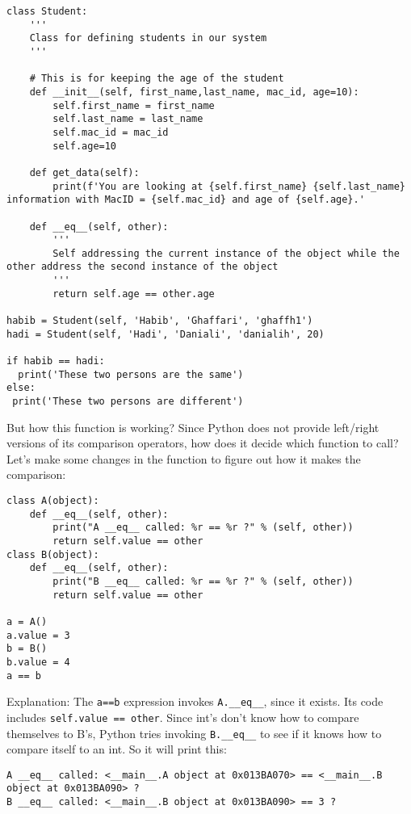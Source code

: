\documentclass[11pt]{article}
\begin{document}
\begin{verbatim}
class Student:
    '''
    Class for defining students in our system
    '''

    # This is for keeping the age of the student
    def __init__(self, first_name,last_name, mac_id, age=10):
        self.first_name = first_name
        self.last_name = last_name
        self.mac_id = mac_id
        self.age=10

    def get_data(self):
        print(f'You are looking at {self.first_name} {self.last_name} information with MacID = {self.mac_id} and age of {self.age}.'

    def __eq__(self, other):
        '''
        Self addressing the current instance of the object while the other address the second instance of the object
        '''
        return self.age == other.age

habib = Student(self, 'Habib', 'Ghaffari', 'ghaffh1')
hadi = Student(self, 'Hadi', 'Daniali', 'danialih', 20)

if habib == hadi:
  print('These two persons are the same')
else:
 print('These two persons are different')
\end{verbatim}

But how this function is working? Since Python does not provide left/right
versions of its comparison operators, how does it decide which function to call?
Let's make some changes in the function to figure out how it makes the
comparison:

\begin{verbatim}
class A(object):
    def __eq__(self, other):
        print("A __eq__ called: %r == %r ?" % (self, other))
        return self.value == other
class B(object):
    def __eq__(self, other):
        print("B __eq__ called: %r == %r ?" % (self, other))
        return self.value == other

a = A()
a.value = 3
b = B()
b.value = 4
a == b
\end{verbatim}

Explanation: The \texttt{a==b} expression invokes \texttt{A.\_\_eq\_\_}, since it exists. Its code
includes \texttt{self.value == other}. Since int's don't know how to compare themselves
to B's, Python tries invoking \texttt{B.\_\_eq\_\_} to see if it knows how to compare itself
to an int. So it will print this:

\begin{verbatim}
A __eq__ called: <__main__.A object at 0x013BA070> == <__main__.B object at 0x013BA090> ?
B __eq__ called: <__main__.B object at 0x013BA090> == 3 ?
\end{verbatim}
\end{document}
